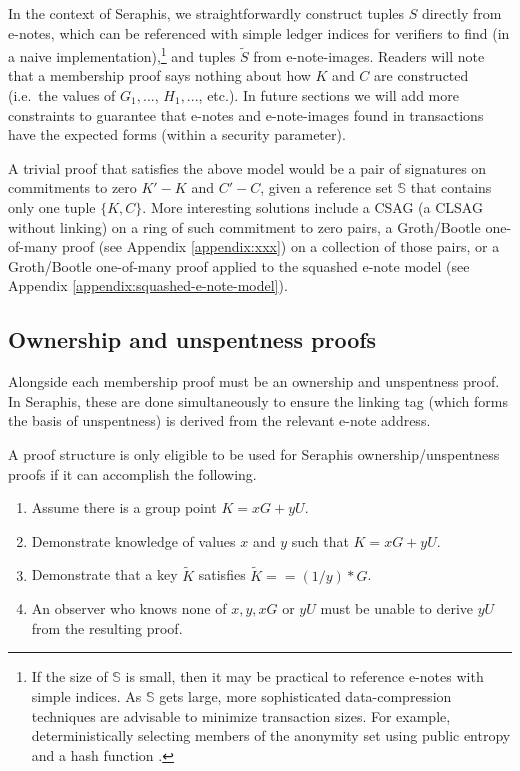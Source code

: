In the context of Seraphis, we straightforwardly construct tuples $S$ directly from e-notes, which can be referenced with simple ledger indices for verifiers to find (in a naive implementation),\footnote{If the size of $\mathbb{S}$ is small, then it may be practical to reference e-notes with simple indices. As $\mathbb{S}$ gets large, more sophisticated data-compression techniques are advisable to minimize transaction sizes. For example, deterministically selecting members of the anonymity set using public entropy and a hash function \cite{chator-green-how-to-squeeze-crowd}.} and tuples $\tilde{S}$ from e-note-images. Readers will note that a membership proof says nothing about how $K$ and $C$ are constructed (i.e.\ the values of $G_1,...$, $H_1,...$, etc.). In future sections we will add more constraints to guarantee that e-notes and e-note-images found in transactions have the expected forms (within a security parameter).

A trivial proof that satisfies the above model would be a pair of signatures on commitments to zero $K' - K$ and $C' - C$, given a reference set $\mathbb{S}$ that contains only one tuple $\{K, C\}$. More interesting solutions include a CSAG (a CLSAG \cite{clsag-eprint} without linking) on a ring of such commitment to zero pairs, a Groth/Bootle \cite{...} one-of-many proof (see Appendix \ref{appendix:xxx}) on a collection of those pairs, or a Groth/Bootle one-of-many proof applied to the squashed e-note model (see Appendix \ref{appendix:squashed-e-note-model}).


\subsection{Ownership and unspentness proofs}
\label{subsec:seraphis-ownership-unspentness-proofs}

Alongside each membership proof must be an ownership and unspentness proof. In Seraphis, these are done simultaneously to ensure the linking tag (which forms the basis of unspentness) is derived from the relevant e-note address.

A proof structure is only eligible to be used for Seraphis ownership/unspentness proofs if it can accomplish the following.

\begin{enumerate}
    \item Assume there is a group point $K = x G + y U$.

    \item Demonstrate knowledge of values $x$ and $y$ such that $K = x G + y U$.

    \item Demonstrate that a key $\tilde{K}$ satisfies $\tilde{K} == (1/y)*G$.

    \item An observer who knows none of $x, y, x G$ or $y U$ must be unable to derive $y U$ from the resulting proof.
\end{enumerate}


